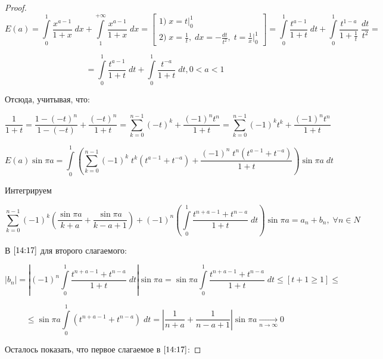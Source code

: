 \documentclass[../../main.tex]{subfiles}
\begin{document}
	\begin{proof}
		\[  E(a) =  \int\limits_{0}^{1}  \frac{x^{a-1}}{1+x} \; dx + \int\limits_{1}^{+\infty} \frac{x^{a-1}}{1+x} \; dx  = \left[  \begin{gathered}
	    1) \; x = t \bigg|_{0}^{1} \\
		2) \; 	x = \frac{1}{t}, \; dx = - \frac{dt}{t^2}, \; t = \frac{1}{x}  \bigg|_{0}^{1}
		\end{gathered}  \right] = \int\limits_{0}^{1} \frac{t^{a-1}}{1+t} \; dt + \int\limits_{0}^{1} \frac{t^{1-a}}{1+\frac{1}{t}} \; \frac{dt}{t^2} =      \]
		
		\[  = \int\limits_{0}^{1} \frac{t^{a-1}}{1+t} \; dt +  \int\limits_{0}^{1} \frac{t^{-a}}{1+t} \; dt, 0<a<1       \]
		
		Отсюда, учитывая, что:
		
		\[  \frac{1}{1+t} = \frac{1-\left( -t\right)^n }{1-\left(-t \right) } + \frac{\left(-t \right)^n }{1+t} = \sum_{k=0}^{n-1} \left( -t\right)^k + \frac{\left( -1\right)^n t^n }{1+t} = \sum_{k=0}^{n-1} \left( -1\right)^k t^k  + \frac{\left( -1\right)^n t^n }{1+t}         \]
		
		\[  E(a) \sin{\pi a} =  \int\limits_{0}^{1} \left( \sum_{k=0}^{n-1} (-1)^k \; t^k \left( t^{a-1} + t^{-a} \right) + \frac{(-1)^n \; t^n \left( t^{a-1} + t^{-a}\right) }{1+t} \right) \sin{\pi a} \; dt        \]
		
		
		Интегрируем
		
		\begin{equation}  
		\label{14:17}
		\sum_{k=0}^{n-1} (-1)^k \left( \frac{\sin{\pi a} }{k+a} + \frac{\sin{\pi a} }{k-a+1} \right) + (-1)^n  \left( \int\limits_{0}^{1} \frac{t^{n+a-1} + t^{n-a}}{1+t} \; dt \right) \sin{\pi a}  = a_n + b_n, \; \forall n \in N         
		\end{equation}
		
		В $\eqref{14:17}$ для второго слагаемого:
		
		\[   \left| b_n \right| = \left| (-1)^n \int\limits_{0}^{1} \frac{t^{n+a-1} + t^{n-a}}{1+t} \; dt \right|  \sin{\pi a} = \sin{\pi a} \int\limits_{0}^{1} \frac{t^{n+a-1} + t^{n-a}}{1+t} \; dt \le \left[ t+1 \ge 1 \right] \le           \]
		
		\[  \le \sin{\pi a} \int\limits_{0}^{1} \left( t^{n+a-1} + t^{n-a} \right)  \; dt = \left| \frac{1}{n+a} + \frac{1}{n-a+1} \right| \sin{\pi a} {\underset{n \to \infty}\rightarrow} 0                  \]
		
		Осталось показать, что первое слагаемое в $\eqref{14:17}$:
		

\end{proof}
\end{document}
